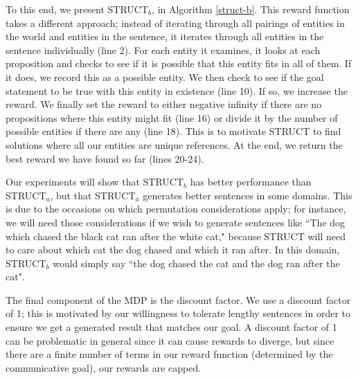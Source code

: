 To this end, we present STRUCT$_b$, in Algorithm \ref{struct-b}.
This reward function takes a different approach; instead of iterating through
all pairings of entities in the world and entities in the sentence, it iterates
through all entities in the sentence individually (line 2).  For each entity it
examines, it looks at each proposition and checks to see if it is possible
that this entity fits in all of them.  If it does, we record this as a possible
entity.  We then check to see if the goal statement
to be true with this entity in existence (line 10).  If so, we increase the
reward.  We finally set the reward to either negative infinity if there are
no propositions where this entity might fit (line 16) or divide it by the number
of possible entities if there are any (line 18).  This is to motivate STRUCT to
find solutions where all our entities are unique references.  At the end,
we return the best reward we have found so far (lines 20-24).

Our experiments will show that STRUCT$_b$
has better performance than STRUCT$_a$, but that STRUCT$_a$ generates better
sentences in some domains.  This is due to the occasions on which
permutation considerations apply; for instance, we will need those considerations
if we wish to generate sentences like ``The dog which chased the black cat ran
after the white cat," because STRUCT will need to care about which cat the dog
chased and which it ran after.  In this domain, STRUCT$_b$ would simply say
``the dog chased the cat and the dog ran after the cat".

The final component of the MDP is the discount factor.  We use a
discount factor of 1; this is motivated by our willingness to tolerate
lengthy sentences in order to ensure we get a generated result
that matches our goal.  A discount factor of 1 can be problematic
in general
since it can cause rewards to diverge, but since there are a finite
number of terms in our reward function (determined by the communicative
goal), our rewards are capped.

